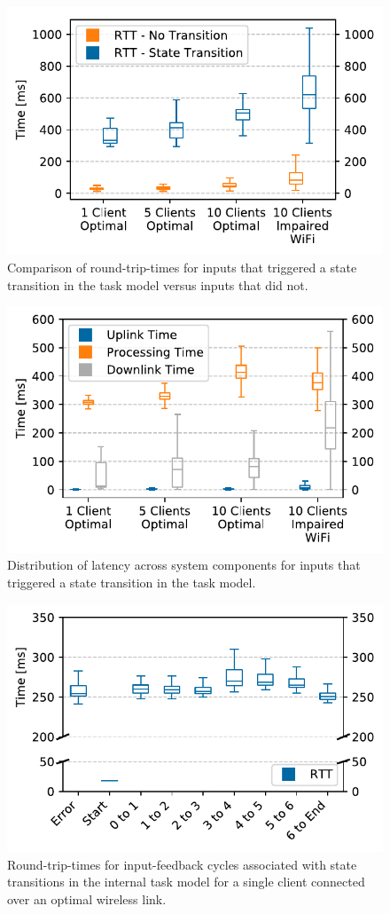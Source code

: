 \begin{figure}
    \centering%
    \includegraphics[width=.85\columnwidth]{plots/comparison/nofonts/rtt_fb_vs_nofb}%
    \caption{Comparison of round-trip-times for inputs that triggered a state transition in the task model versus inputs that did not.}%
    \label{fig:comparison:rtt}%
\end{figure}%
\begin{figure}
    \centering%
    \includegraphics[width=.85\columnwidth]{plots/comparison/nofonts/box_feedback}%
    \caption{Distribution of latency across system components for inputs that triggered a state transition in the task model.}%
    \label{fig:comparison:feedback}%
\end{figure}%
\begin{figure}%
    \centering%
    \includegraphics[width=.85\columnwidth]{plots/comparison/nofonts/box_taskstep}%
    \caption{Round-trip-times for input-feedback cycles associated with state transitions in the internal task model for a single client connected over an optimal wireless link.}%
    \label{fig:comparison:tasksteps}
\end{figure}%

